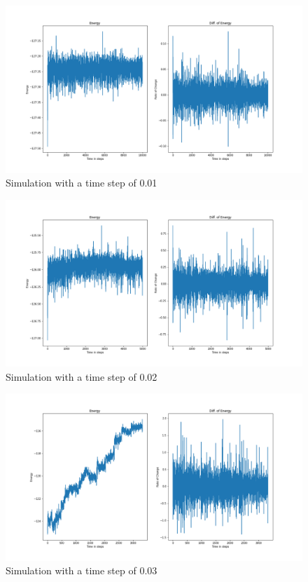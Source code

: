 \begin{figure}[!h]
	\begin{center}
		\includegraphics[scale= 0.35]{Figure/plot_01.png}
	\end{center}
	\caption[Simulation]{Simulation with a time step of 0.01}
	\label{Plot01}
\end{figure}
\begin{figure}[!h]
	\begin{center}
		\includegraphics[scale= 0.35]{Figure/plot_02.png}
	\end{center}
	\caption[Simulation]{Simulation with a time step of 0.02 }
	\label{Plot02}
\end{figure}
\begin{figure}[!h]
	\begin{center}
		\includegraphics[scale= 0.35]{Figure/plot_03.png}
	\end{center}
	\caption[Simulation]{Simulation with a time step of 0.03 }
	\label{Plot03}
\end{figure}
